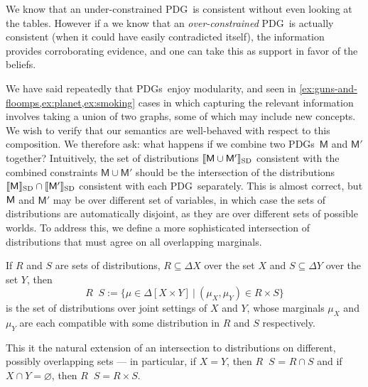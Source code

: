 \documentclass{article}
\newcommand{\notation}[2][]{#1}
\renewcommand{\notation}[2][]{{\color{notationcolor} #2}}
\newcommand\SD{_{\text{SD}}}
\DeclareMathOperator\dcap{\mathop{\dot\cap}}
\newcommand{\sfM}{\mathsf M}
\newcommand{\MN}{PDG}
\newcommand{\MNs}{\MN s}
\numberwithin{equation}{section}
\begin{document}
\begin{notfocus}
{	We know that an under-constrained \MN\ is consistent without even looking at the tables. However if a we know that an \emph{over-constrained} \MN\ is actually consistent (when it could have easily contradicted itself), the information provides corroborating evidence, and one can take this as support in favor of the beliefs. 
	}


	We have said repeatedly that \MNs\ enjoy modularity, and seen in \cref{ex:guns-and-floomps,ex:planet,ex:smoking} cases in which capturing the relevant information involves taking a union of two graphs, some of which may include new concepts. We wish to verify that our semantics are well-behaved with respect to this composition.	 
	We therefore ask: what happens if we combine two \MNs\ $\sfM$ and $\sfM'$ together? Intuitively, the set of distributions $\bbr{\sfM \cup \sfM'}\SD$ consistent with the combined constraints $\sfM\cup \sfM'$ should be the intersection of the distributions $\bbr{\sfM}\SD \cap \bbr{\sfM'}\SD$ consistent with each \MN\ separately. This is almost correct, but $\sf M$ and $\sfM'$ may be over different set of variables, in which case the sets of distributions are automatically disjoint, as they are over different sets of possible worlds. To address this, we define a more sophisticated intersection of distributions that must agree on all overlapping marginals. %
	
	\begin{defn}[$\dcap$]\label{def:marginal-dist-intersection}
		If $R$ and $S$ are sets of distributions, $R \subseteq \Delta X$ over the set $X$ and $S\subseteq \Delta Y$ over the set $Y$, then
			{$$R \dcap S := \Big\{ \mu \in  \Delta [X \!\times\! Y] ~\Big|~ (\mu_{X}, \mu_{Y}) \in R \times S \Big\}  $$}%
		is the set of distributions over joint settings of $X$ and $Y$, whose marginals $\mu_X$ and $\mu_Y$ are each compatible with some distribution in $R$ and $S$ respectively. 
		
		This it the natural extension of an intersection to distributions on different, possibly overlapping sets --- in particular, if $X = Y$, then $R \dcap S$ = $R \cap S$ and if \notation[$X$ and $Y$ are disjoint]{$X \cap Y = \varnothing$}, then $R \dcap S = R \times S$. 
	\end{defn}
	

\end{notfocus}
\end{document}
